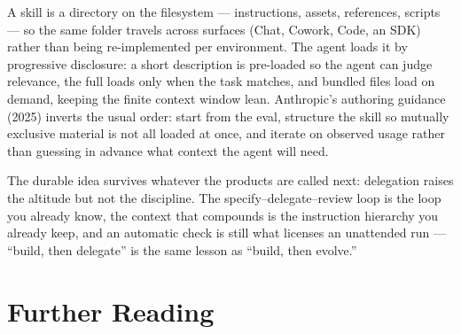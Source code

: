 \begin{remark}
A skill is a directory on the filesystem --- instructions, assets, references, scripts --- so the same folder travels across surfaces (Chat, Cowork, Code, an SDK) rather than being re-implemented per environment.
The agent loads it by progressive disclosure: a short description is pre-loaded so the agent can judge relevance, the full  loads only when the task matches, and bundled files load on demand, keeping the finite context window lean.
Anthropic's authoring guidance (2025) inverts the usual order: start from the eval, structure the skill so mutually exclusive material is not all loaded at once, and iterate on observed usage rather than guessing in advance what context the agent will need.
\end{remark}

The durable idea survives whatever the products are called next: delegation raises the altitude but not the discipline.
The specify--delegate--review loop is the loop you already know, the context that compounds is the instruction hierarchy you already keep, and an automatic check is still what licenses an unattended run --- ``build, then delegate'' is the same lesson as ``build, then evolve.''

\section*{Further Reading}

